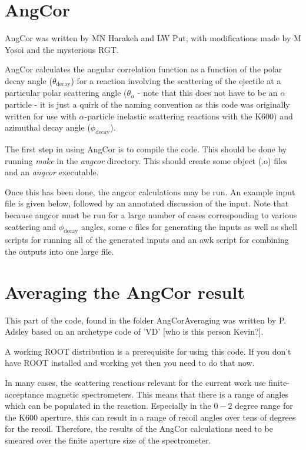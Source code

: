 \documentclass[a4paper,10pt]{article}
\begin{document}
\section{AngCor}

AngCor was written by MN Harakeh and LW Put, with modifications made by M Yosoi and the mysterious RGT.

AngCor calculates the angular correlation function as a function of the polar decay angle ($\theta_{\mathrm{decay}}$) for a reaction involving the scattering of the ejectile at a particular polar scattering angle ($\theta_{\alpha}$ - note that this does not have to be an $\alpha$ particle - it is just a quirk of the naming convention as this code was originally written for use with $\alpha$-particle inelastic scattering reactions with the K600) and azimuthal decay angle ($\phi_{\mathrm{decay}}$).

The first step in using AngCor is to compile the code. This should be done by running {\it make} in the {\it angcor} directory. This should create some object (.o) files and an {\it angcor} executable.

Once this has been done, the angcor calculations may be run. An example input file is given below, followed by an annotated discussion of the input. Note that because angcor must be run for a large number of cases corresponding to various scattering and $\phi_\mathrm{decay}$ angles, some c files for generating the inputs as well as shell scripts for running all of the generated inputs and an awk script for combining the outputs into one large file.



\section{Averaging the AngCor result}

This part of the code, found in the folder AngCorAveraging was written by P. Adsley based on an archetype code of 'VD' [who is this person Kevin?].

A working ROOT distribution is a prerequisite for using this code. If you don't have ROOT installed and working yet then you need to do that now.

In many cases, the scattering reactions relevant for the current work use finite-acceptance magnetic spectrometers. This means that there is a range of angles which can be populated in the reaction. Especially in the $0-2$ degree range for the K600 aperture, this can result in a range of recoil angles over tens of degrees for the recoil. Therefore, the results of the AngCor calculations need to be smeared over the finite aperture size of the spectrometer.
\end{document}
